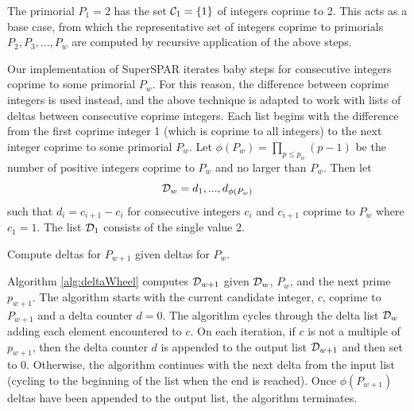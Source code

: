 \documentclass{ucalgthes1}
\theoremstyle{definition}
\newcommand{\algnewline}{\par\noindent\hskip\algorithmicindent}
\begin{document}
The primorial $P_1 = 2$ has the set $\mathcal C_1 = \{1\}$ of integers coprime to 2.  This acts as a base case, from which the representative set of integers coprime to primorials $P_2, P_3, ..., P_w$ are computed by recursive application of the above steps.

Our implementation of SuperSPAR iterates baby steps for consecutive integers coprime to some primorial $P_w$.  For this reason, the difference between coprime integers is used instead, and the above technique is adapted to work with lists of deltas between consecutive coprime integers.  Each list begins with the difference from the first coprime integer 1 (which is coprime to all integers) to the next integer coprime to some primorial $P_w$.   Let $\phi(P_w) = \prod_{p \le p_w}(p-1)$ be the number of positive integers coprime to $P_w$ and no larger than $P_w$.  Then let
\[
	\mathcal D_w = d_1, ..., d_{\phi(P_w)}
\]
such that $d_i = c_{i+1} - c_i$ for consecutive integers $c_i$ and $c_{i+1}$ coprime to $P_w$ where $c_1 = 1$. The list $\mathcal D_1$ consists of the single value 2.

\begin{algorithm}[htb]
\caption{Compute deltas for $P_{w+1}$ given deltas for $P_w$.}
\label{alg:deltaWheel}
\end{algorithm}

Algorithm \ref{alg:deltaWheel} computes $\mathcal D_{w+1}$ given $\mathcal D_w$, $P_w$, and the next prime $p_{w+1}$.  The algorithm starts with the current candidate integer, $c$, coprime to $P_{w+1}$ and a delta counter $d = 0$.  The algorithm cycles through the delta list $\mathcal D_w$ adding each element encountered to $c$.  On each iteration, if $c$ is not a multiple of $p_{w+1}$, then the delta counter $d$ is appended to the output list $\mathcal D_{w+1}$ and then set to 0.  Otherwise, the algorithm continues with the next delta from the input list (cycling to the beginning of the list when the end is reached).  Once $\phi(P_{w+1})$ deltas have been appended to the output list, the algorithm terminates.
\end{document}
